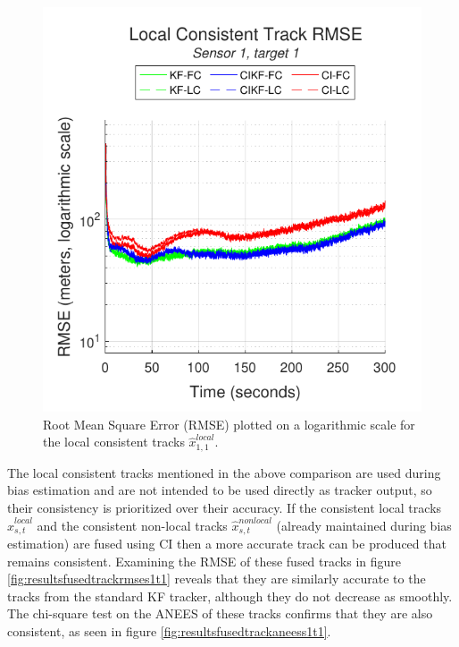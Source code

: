 \documentclass[journal]{IEEEtran}
\begin{document}
\begin{figure}[ht]
    \centering
    \includegraphics[scale=0.85]{localtrack_rmse_s1t1.pdf}
    \caption{Root Mean Square Error (RMSE) plotted on a logarithmic scale for the local consistent tracks $\hat{x}_{1,1}^{local}$.}
    \label{fig:resultslocaltrackrmses1t1}
\end{figure}

The local consistent tracks mentioned in the above comparison are used during bias estimation and are not intended to be used directly as tracker output, so their consistency is prioritized over their accuracy. If the consistent local tracks $\hat{x}_{s,t}^{local}$ and the consistent non-local tracks $\hat{x}_{s,t}^{nonlocal}$ (already maintained during bias estimation) are fused using CI then a more accurate track can be produced that remains consistent. Examining the RMSE of these fused tracks in figure \ref{fig:resultsfusedtrackrmses1t1} reveals that they are similarly accurate to the tracks from the standard KF tracker, although they do not decrease as smoothly. The chi-square test on the ANEES of these tracks confirms that they are also consistent, as seen in figure \ref{fig:resultsfusedtrackaneess1t1}.
\end{document}
